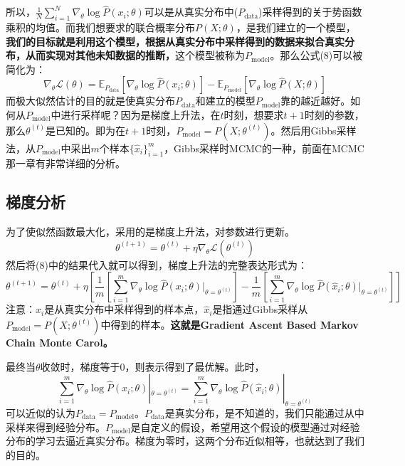 \documentclass[a4paper]{article}
\begin{document}
所以，$ \frac{1}{N} \sum_{i=1}^N \nabla_\theta \log \hat{P}(x_i;\theta)$可以是从真实分布中($P_{\mathrm{data}}$)采样得到的关于势函数乘积的均值。而我们想要求的联合概率分布$P(X;\theta)$，是我们建立的一个模型，\textbf{我们的目标就是利用这个模型，根据从真实分布中采样得到的数据来拟合真实分布，从而实现对其他未知数据的推断，}这个模型被称为$P_{\mathrm{model}}$。那么公式(8)可以被简化为：
\begin{equation}
    \nabla_\theta \mathcal{L}(\theta) = \mathbb{E}_{P_{\mathrm{data}}}[ \nabla_\theta \log \hat{P}(x_i;\theta) ] - \mathbb{E}_{P_{\mathrm{model}}}[\nabla_\theta \log \hat{P}(X;\theta)]
\end{equation}
{\color{red}而极大似然估计的目的就是使真实分布$P_{\mathrm{data}}$和建立的模型$P_{\mathrm{model}}$靠的越近越好。}如何从$P_{\mathrm{model}}$中进行采样呢？因为是梯度上升法，在$t$时刻，想要求$t+1$时刻的参数，那么$\theta^{(t)}$是已知的。即为在$t+1$时刻，$P_{\mathrm{model}}=P(X;\theta^{(t)})$。然后用Gibbs采样法，从$P_{\mathrm{model}}$中采出$m$个样本$\{\hat{x}_i\}_{i=1}^m$，Gibbs采样时MCMC的一种，前面在MCMC那一章有非常详细的分析。

\subsection{梯度分析}
为了使似然函数最大化，采用的是梯度上升法，对参数进行更新。
$$
\theta^{(t+1)} = \theta^{(t)} + \eta \nabla_\theta \mathcal{L}(\theta^{(t)})
$$
然后将(8)中的结果代入就可以得到，梯度上升法的完整表达形式为：
\begin{equation}
    \theta^{(t+1)} = \theta^{(t)} + \eta \left[ \frac{1}{m} \left[ \sum_{i=1}^m \nabla_\theta \log \hat{P}(x_i;\theta)|_{\theta=\theta^{(t)}} \right] - \frac{1}{m} \left[ \sum_{i=1}^m \nabla_\theta \log \hat{P}(\hat{x}_i;\theta)|_{\theta=\theta^{(t)}} \right]
    \right]
\end{equation}
注意：$x_i$是从真实分布中采样得到的样本点，$\hat{x}_i$是指通过Gibbs采样从$P_{\mathrm{model}}=P(X;\theta^{(t)})$中得到的样本。\textbf{这就是Gradient Ascent Based Markov Chain Monte Carol。}

最终当$\theta$收敛时，梯度等于0，则表示得到了最优解。此时，$$ \sum_{i=1}^m \nabla_\theta \log \hat{P}(x_i;\theta)|_{\theta=\theta^{(t)}} =  \sum_{i=1}^m \nabla_\theta \log \hat{P}(\hat{x}_i;\theta)|_{\theta=\theta^{(t)}}$$
可以近似的认为$P_{\mathrm{data}} = P_{\mathrm{model}}$。$P_{\mathrm{data}}$是真实分布，是不知道的，我们只能通过从中采样来得到经验分布。$P_\mathrm{model}$是自定义的假设，希望用这个假设的模型通过对经验分布的学习去逼近真实分布。梯度为零时，这两个分布近似相等，也就达到了我们的目的。
\end{document}
